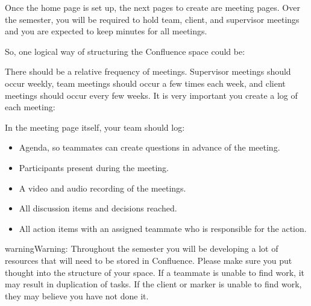 \documentclass[letterpaper,10pt,english]{jupyterBook}
\begin{document}
\sphinxAtStartPar
{}

\sphinxAtStartPar
Once the home page is set up, the next pages to create are meeting
pages. Over the semester, you will be required to hold team, client, and
supervisor meetings and you are expected to keep minutes for all
meetings.

\sphinxAtStartPar
So, one logical way of structuring the Confluence space could be:

\sphinxAtStartPar
{}

\sphinxAtStartPar
There should be a relative frequency of meetings. Supervisor meetings
should occur weekly, team meetings should occur a few times each week,
and client meetings should occur every few weeks. It is very important
you create a log of each meeting:

\sphinxAtStartPar
{}

\sphinxAtStartPar
In the meeting page itself, your team should log:
\begin{itemize}
\item {} 
\sphinxAtStartPar
Agenda, so teammates can create questions in advance of the meeting.

\item {} 
\sphinxAtStartPar
Participants present during the meeting.

\item {} 
\sphinxAtStartPar
A video and audio recording of the meetings.

\item {} 
\sphinxAtStartPar
All discussion items and decisions reached.

\item {} 
\sphinxAtStartPar
All action items with an assigned teammate who is responsible for
the action.

\end{itemize}

\sphinxAtStartPar
{}

\begin{sphinxadmonition}{warning}{Warning:}
\sphinxAtStartPar
Throughout the semester you will be developing a
lot of resources that will need to be stored in Confluence. Please make
sure you put thought into the structure of your space. If a teammate is
unable to find work, it may result in duplication of tasks. If the
client or marker is unable to find work, they may believe you have not
done it.
\end{sphinxadmonition}
\end{document}
